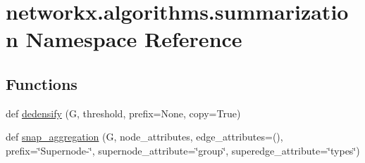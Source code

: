 \hypertarget{namespacenetworkx_1_1algorithms_1_1summarization}{}\section{networkx.\+algorithms.\+summarization Namespace Reference}
\label{namespacenetworkx_1_1algorithms_1_1summarization}
\subsection*{Functions}
\begin{DoxyCompactItemize}
\item 
def \hyperlink{namespacenetworkx_1_1algorithms_1_1summarization_a76e504c9155b6b0e797ed530ff73d0a7}{dedensify} (G, threshold, prefix=None, copy=True)
\item 
def \hyperlink{namespacenetworkx_1_1algorithms_1_1summarization_a0445ab90444d00989bb2e81c66a90370}{snap\+\_\+aggregation} (G, node\+\_\+attributes, edge\+\_\+attributes=(), prefix=\char`\"{}Supernode-\/\char`\"{}, supernode\+\_\+attribute=\char`\"{}group\char`\"{}, superedge\+\_\+attribute=\char`\"{}types\char`\"{})
\end{DoxyCompactItemize}


